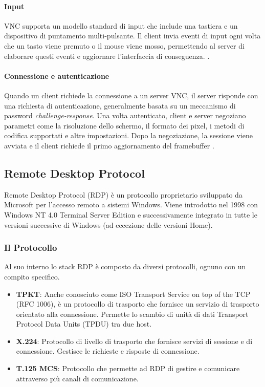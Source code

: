 \documentclass[12pt,a4paper,openright,twoside]{book}
\begin{document}
\paragraph{Input}

VNC supporta un modello standard di input che include una tastiera e un dispositivo di puntamento multi-pulsante. Il client invia eventi di input ogni volta che un tasto viene premuto o il mouse viene mosso, permettendo al server di elaborare questi eventi e aggiornare l'interfaccia di conseguenza. \cite{richardson1998vnc}.

\paragraph{Connessione e autenticazione}

Quando un client richiede la connessione a un server VNC, il server risponde con una richiesta di autenticazione, generalmente basata su un meccanismo di password \textit{challenge-response}. Una volta autenticato, client e server negoziano parametri come la risoluzione dello schermo, il formato dei pixel, i metodi di codifica supportati e altre impostazioni. Dopo la negoziazione, la sessione viene avviata e il client richiede il primo aggiornamento del framebuffer \cite{richardson1998vnc}.

\subsection{Remote Desktop Protocol}

Remote Desktop Protocol (RDP) è un protocollo proprietario sviluppato da Microsoft per l'accesso remoto a sistemi Windows. Viene introdotto nel 1998 con Windows NT 4.0 Terminal Server Edition e successivamente integrato in tutte le versioni successive di Windows (ad eccezione delle versioni Home).

\subsubsection{Il Protocollo}
Al suo interno lo stack RDP è composto da diversi protocolli, ognuno con un compito specifico.
\begin{itemize}
    \item \textbf{TPKT}: Anche conosciuto come ISO Transport Service on top of the TCP (RFC 1006), è un protocollo di trasporto che fornisce un servizio di trasporto orientato alla connessione. Permette lo scambio di unità di dati Transport Protocol Data Units (TPDU) tra due host.
    \item \textbf{X.224}: Protocollo di livello di trasporto che fornisce servizi di sessione e di connessione. Gestisce le richieste e risposte di connessione.
    \item \textbf{T.125 MCS}: Protocollo che permette ad RDP di gestire e comunicare attraverso più canali di comunicazione.
\end{itemize}
\end{document}
